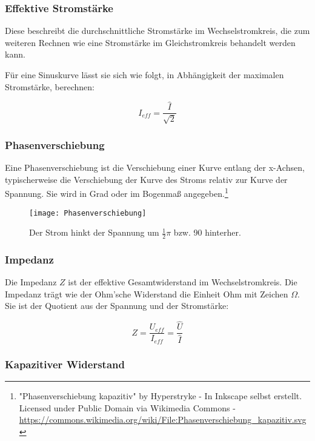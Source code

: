 \subsubsection{Effektive Stromstärke}

Diese beschreibt die durchschnittliche Stromstärke im Wechselstromkreis, die zum weiteren Rechnen wie eine Stromstärke im Gleichstromkreis behandelt werden kann.

Für eine Sinuskurve lässt sie sich wie folgt, in Abhängigkeit der maximalen Stromstärke, berechnen:

\begin{equation}	\label{eq:EffektiveStromstaerke}
	I_{eff}=\frac{\hat{I}}{\sqrt{2}}
\end{equation}


\subsubsection{Phasenverschiebung}

Eine Phasenverschiebung ist die Verschiebung einer Kurve entlang der x-Achsen, typischerweise die Verschiebung der Kurve des Stroms relativ zur Kurve der Spannung. Sie wird in Grad oder im Bogenmaß angegeben.\footnote{"Phasenverschiebung kapazitiv" by Hyperstryke - In Inkscape selbst erstellt. Licensed under Public Domain via Wikimedia Commons - \url{https://commons.wikimedia.org/wiki/File:Phasenverschiebung_kapazitiv.svg}}

\begin{figure}[h!]
	\centering
	\texttt{[image: Phasenverschiebung]}
	\caption{\glqq Der Strom hinkt der Spannung um $\frac{1}{2}\pi$ bzw. 90\degree{} hinterher.\grqq }
\end{figure}


\subsubsection{Impedanz}

Die Impedanz $Z$ ist der effektive Gesamtwiderstand im Wechselstromkreis. Die Impedanz trägt wie der Ohm'sche Widerstand die Einheit Ohm mit Zeichen $\Omega$. Sie ist der Quotient aus der Spannung und der Stromstärke:

\begin{equation}		\label{eq:Impedanz}
	Z = \frac{U_{eff}}{I_{eff}}
	  = \frac{\hat{U}}{\hat{I}}
\end{equation}


\subsubsection{Kapazitiver Widerstand}

